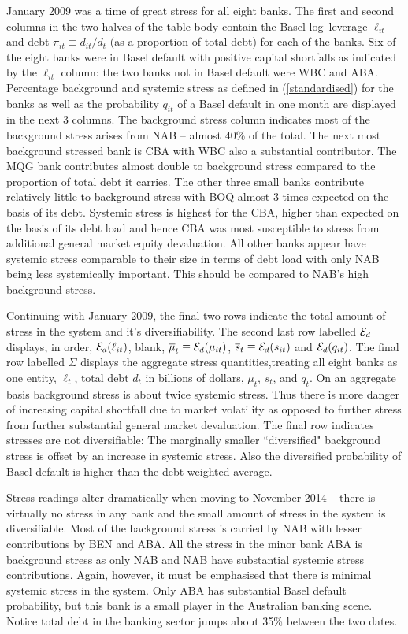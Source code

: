 \documentclass[12pt]{article}
\newcommand{\Ex}{{\cal E}}
\newcommand{\eref}[1]{(\ref{#1})}
\begin{document}
January 2009 was a time of great stress for all eight banks.     The first  and second columns in the two halves of the table body contain the 
 Basel log--leverage $\ell_{it}$ and debt $\pi_{it}\equiv d_{it}/d_t$ (as a proportion of total debt) for each of the banks.  Six of the eight banks were in Basel default with positive capital shortfalls as indicated by the $\ell_{it}$ column:   the two banks not in Basel default were WBC and ABA.    Percentage background and systemic stress as defined in \eref{standardised} 
for the banks as well as the probability $q_{it}$ of a Basel default in one month are displayed in the next 3 columns.    The background stress column indicates most of the background stress arises from NAB -- almost 40\% of the total.   The next most background stressed bank is CBA with WBC also a substantial contributor.   The MQG bank contributes almost double to background stress compared to the proportion of total debt  it carries.  The other three small banks contribute relatively little to background stress with BOQ  almost 3 times expected on the basis of its debt.   Systemic stress is highest for the CBA, higher than expected on the basis of its debt load and hence CBA was most susceptible to stress from additional general market equity devaluation.    All other banks appear have systemic stress comparable to their size in terms of debt load with only NAB being less systemically important.    This should be compared to NAB's high background stress.

Continuing with January 2009, the final two rows indicate the total amount of stress in the system and it's diversifiability.    
The second last  row labelled $\Ex_d$  displays, in order, $\Ex_d(\ell_{it})$, blank, $\overline{\mu}_t\equiv \Ex_d(\mu_{it})$, $\overline{s}_t\equiv\Ex_d(s_{it})$ and  $\Ex_d(q_{it})$.   The final row labelled $\Sigma$ displays the aggregate stress quantities,treating all eight banks as one entity, $\ell_t$, total debt $d_t$ in billions of dollars,  $\mu_t$, $s_t$, and  $q_t$.
On an aggregate basis background stress is about twice systemic stress.   Thus there is more danger of increasing capital shortfall due to market volatility  as opposed to further stress from further substantial general market devaluation.  The final row indicates stresses are not diversifiable:    The marginally  smaller  ``diversified"  background stress is offset by an increase in systemic stress.    Also the diversified probability of Basel default is higher than the debt weighted average.   

Stress readings  alter dramatically when moving to November 2014 -- there is virtually no stress in any bank and the small amount of  stress in the system is diversifiable.    Most of the  background stress is carried by NAB with lesser contributions by BEN and ABA.    All the stress in the minor bank ABA is background stress as only NAB and NAB have substantial systemic stress contributions.   Again, however, it must be emphasised that there is minimal systemic stress in the system.    Only ABA has substantial Basel default probability, but this bank is a small player in the Australian banking scene.   Notice total debt in the banking sector  jumps about 35\% between the two dates.
\end{document}
